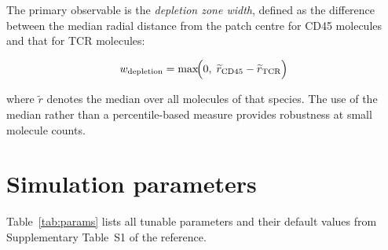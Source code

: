 \documentclass[11pt,a4paper]{article}
\begin{document}
The primary observable is the \emph{depletion zone width}, defined as
the difference between the median radial distance from the patch
centre for CD45 molecules and that for TCR molecules:

\begin{equation}
  w_\text{depletion}
  = \max\!\Bigl(0,\;
    \widetilde{r}_\text{CD45} - \widetilde{r}_\text{TCR}\Bigr)
\end{equation}

\noindent
where $\widetilde{r}$ denotes the median over all molecules of that
species.  The use of the median rather than a percentile-based measure
provides robustness at small molecule counts.


\section{Simulation parameters}
\label{sec:params}

Table~\ref{tab:params} lists all tunable parameters and their default
values from Supplementary Table~S1 of the reference.
\end{document}
